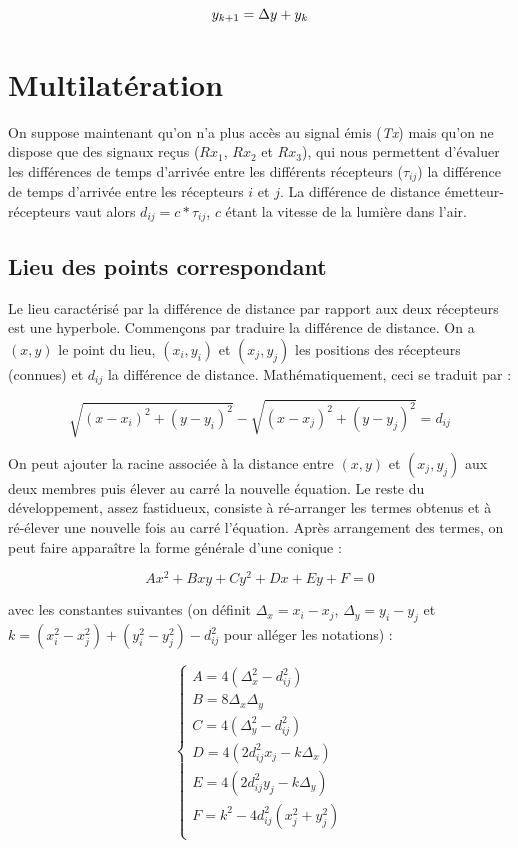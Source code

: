 \documentclass[10pt,a4paper]{article}
\begin{document}
\begin{equation}
	\centering
	\label{ny}
	y_{k+1} = \Delta y + y_k
\end{equation}


			
\section{Multilatération}
On suppose maintenant qu'on n'a plus accès au signal émis (\textit{Tx}) mais qu'on ne dispose que des signaux reçus ($Rx_1$, $Rx_2$ et $Rx_3$), qui nous permettent d'évaluer les différences de temps d'arrivée entre les différents récepteurs ($\tau_{ij}$) la différence de temps d'arrivée entre les récepteurs $i$ et $j$. La différence de distance émetteur-récepteurs vaut alors $d_{ij} = c*\tau_{ij}$, $c$ étant la vitesse de la lumière dans l'air.

\subsection{Lieu des points correspondant}
Le lieu caractérisé par la différence de distance par rapport aux deux récepteurs est une hyperbole. Commençons par traduire la différence de distance. On a $(x,y)$ le point du lieu, $(x_i,y_i)$ et $(x_j,y_j)$ les positions des récepteurs (connues) et $d_{ij}$ la différence de distance. Mathématiquement, ceci se traduit par :

\begin{equation}
\sqrt{(x-x_i)^2 + (y-y_i)^2} - \sqrt{(x-x_j)^2 + (y-y_j)^2} = d_{ij}
\label{Hyperbole}
\end{equation}

On peut ajouter la racine associée à la distance entre $(x,y)$ et $(x_j,y_j)$ aux deux membres puis élever au carré la nouvelle équation. Le reste du développement, assez fastidueux, consiste à ré-arranger les termes obtenus et à ré-élever une nouvelle fois au carré l'équation. Après arrangement des termes, on peut faire apparaître la forme générale d'une conique :

\begin{equation}
Ax^2 + Bxy + Cy^2 + Dx + Ey + F = 0
\end{equation}

avec les constantes suivantes (on définit $\Delta_x = x_i - x_j$, $\Delta_y = y_i - y_j$ et $k = (x_i^2 - x_j^2) + (y_i^2 - y_j^2) - d_{ij}^2$ pour alléger les notations) :


$$\begin{cases}
A = 4(\Delta_x^2 - d_{ij}^2)\\
B = 8\Delta_x \Delta_y\\
C = 4(\Delta_y^2 - d_{ij}^2)\\
D = 4(2d_{ij}^2x_j-k\Delta_x)\\
E = 4(2d_{ij}^2y_j-k\Delta_y)\\
F = k^2-4d_{ij}^2(x_j^2+y_j^2)\\
\end{cases}$$
\end{document}
